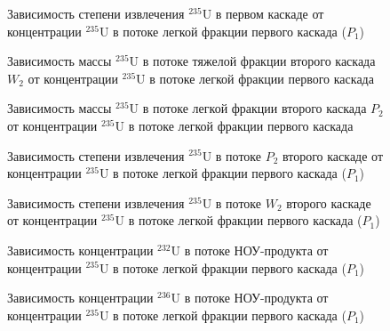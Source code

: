 \begin{figure}[ht]
    \centering
      
    \caption{Зависимость степени извлечения $^{235}$U в первом каскаде от концентрации $^{235}$U в потоке легкой фракции первого каскада ($P_1$)}\label{ex1P1}
\end{figure}

\begin{figure}[ht]
    \centering
    \begin{minipage}{.5\textwidth}
      \centering
      
\caption{{Зависимость массы $^{235}$U в потоке тяжелой фракции второго каскада $W_2$ от концентрации $^{235}$U в потоке легкой фракции первого каскада{\label{M235W2}}}}
    \end{minipage}%
    \begin{minipage}{.5\textwidth}
      \centering
      
\caption{{Зависимость массы $^{235}$U в потоке легкой фракции второго каскада $P_2$ от концентрации $^{235}$U в потоке легкой фракции первого каскада{\label{M235P2}}}}
\end{minipage}
\end{figure}

\begin{figure}[ht]
    \centering
    \begin{minipage}{.5\textwidth}
        \centering
        
  \caption{{Зависимость степени извлечения $^{235}$U в потоке $P_2$ второго каскаде от концентрации $^{235}$U в потоке легкой фракции первого каскада ($P_1$){\label{EX_P2}}}}
  \end{minipage}%
    \begin{minipage}{.5\textwidth}
      \centering
      
\caption{{Зависимость степени извлечения $^{235}$U в потоке $W_2$ второго каскаде от концентрации $^{235}$U в потоке легкой фракции первого каскада ($P_1$){\label{EX_W2}}}}
    \end{minipage}
\end{figure}

\begin{figure}[ht]
  \centering
  \begin{minipage}{.5\textwidth}
    \centering
    
    \caption{{Зависимость концентрации $^{232}$U в потоке НОУ-продукта от концентрации $^{235}$U в потоке легкой фракции первого каскада ($P_1$){\label{C232P}}}}
  \end{minipage}%
  \begin{minipage}{.5\textwidth}
    \centering
    
    \caption{{Зависимость концентрации $^{236}$U в потоке НОУ-продукта от концентрации $^{235}$U в потоке легкой фракции первого каскада ($P_1$){\label{C236P}}}}
\end{minipage}
\end{figure}


